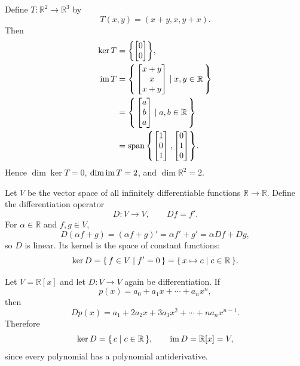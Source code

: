 \begin{Example}
Define $T\colon\mathbb R^2\to\mathbb R^3$ by
\begin{equation*}
T(x,y)=(x+y,x,y+x).
\end{equation*}
Then
\begin{align*}
\ker T&=\qty{\begin{bmatrix}0\\0\end{bmatrix}},\\
\operatorname{im} T&=\qty{\, \begin{bmatrix}x+y\\x\\x+y\end{bmatrix} \mid x,y\in\mathbb R \,}\\
 &=\qty{\, \begin{bmatrix}a\\b\\a\end{bmatrix} \mid a,b\in\mathbb R \,}\\
 &=\operatorname{span}\qty{\begin{bmatrix}1\\0\\1\end{bmatrix},\begin{bmatrix}0\\1\\0\end{bmatrix}}.
\end{align*}
Hence $\dim\ker T=0$, $\dim\operatorname{im} T=2$, and $\dim\mathbb R^2=2$.
\end{Example}

\begin{Example}
Let $V$ be the vector space of all infinitely differentiable functions $\mathbb R\to\mathbb R$. Define the differentiation operator
\begin{equation*}
D\colon V\to V,\qquad Df=f'.
\end{equation*}
For $\alpha\in\mathbb R$ and $f,g\in V$,
\begin{equation*}
D(\alpha f+g)=(\alpha f+g)'=\alpha f'+g'=\alpha Df+Dg,
\end{equation*}
so $D$ is linear. Its kernel is the space of constant functions:
\begin{equation*}
\ker D=\qty{\, f\in V \mid f'=0 \,}=\qty{\, x\mapsto c \mid c\in\mathbb R\,}.
\end{equation*}
\end{Example}

\begin{Example}
Let $V=\mathbb R[x]$ and let $D\colon V\to V$ again be differentiation. If
\begin{equation*}
p(x)=a_0+a_1x+\cdots+a_nx^n,
\end{equation*}
then
\begin{equation*}
Dp(x)=a_1+2a_2x+3a_3x^2+\cdots+na_nx^{n-1}.
\end{equation*}
Therefore
\begin{equation*}
\ker D=\qty{\, c \mid c\in\mathbb R\,},\qquad \operatorname{im} D=\mathbb R[x]=V,
\end{equation*}
since every polynomial has a polynomial antiderivative.
\end{Example}











